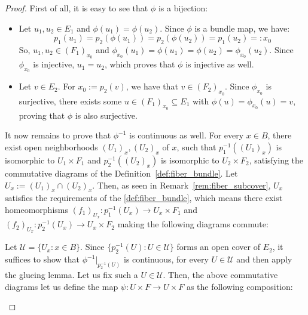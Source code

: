 \begin{proof} First of all, it is easy to see that $\phi$ is a bijection:
\begin{itemize}
\item Let $u_1,u_2\in E_1$ and $\phi(u_1)=\phi(u_2)$. Since $\phi$ is a bundle map, we have:
\[p_1(u_1)=p_2(\phi(u_1))=p_2(\phi(u_2))=p_1(u_2)=:x_0\]
So, $u_1,u_2\in\left(F_1\right)_{x_0}$ and $\phi_{x_0}(u_1)=\phi(u_1)=\phi(u_2)=\phi_{x_0}(u_2)$. Since $\phi_{x_0}$ is injective, $u_1=u_2$, which proves that $\phi$ is injective as well.
\item Let $v\in E_2$. For $x_0:=p_2(v)$, we have that $v\in\left(F_2\right)_{x_0}$. Since $\phi_{x_0}$ is surjective, there exists some $u\in\left(F_1\right)_{x_0}\subseteq E_1$ with $\phi(u)=\phi_{x_0}(u)=v$, proving that $\phi$ is also surjective.
\end{itemize}
It now remains to prove that $\phi^{-1}$ is continuous as well. For every $x\in B$, there exist open neighborhoods ${(U_1)}_x,{(U_2)}_x$ of $x$, such that $p_1^{-1}({(U_1)}_x)$ is isomorphic to $U_1\times F_1$ and $p_2^{-1}({(U_2)}_x)$ is isomorphic to $U_2\times F_2$, satisfying the commutative diagrams of the Definition~\ref{def:fiber_bundle}. Let $U_x:=(U_1)_x\cap(U_2)_x$. Then, as seen in Remark~\ref{rem:fiber_subcover}, $U_x$ satisfies the requirements of the \ref{def:fiber_bundle}, which means there exist homeomorphisms $(f_1)_{U_x}:p_1^{-1}(U_x)\to U_x\times F_1$ and $(f_2)_{U_x}:p_2^{-1}(U_x)\to U_x\times F_2$ making the following diagrams commute:
\begin{center}
\end{center}
Let $\mathcal{U}=\{U_x:x\in B\}$. Since $\{p_2^{-1}(U):U\in\mathcal{U}\}$ forms an open cover of $E_2$, it suffices to show that $\phi^{-1}|_{p_2^{-1}(U)}$ is continuous, for every $U\in\mathcal{U}$ and then apply the glueing lemma. Let us fix such a $U\in\mathcal{U}$. Then, the above commutative diagrams let us define the map $\psi:U\times F\to U\times F$ as the following composition:
\vspace*{-1em}
\begin{center}
\end{center}
\end{proof}
